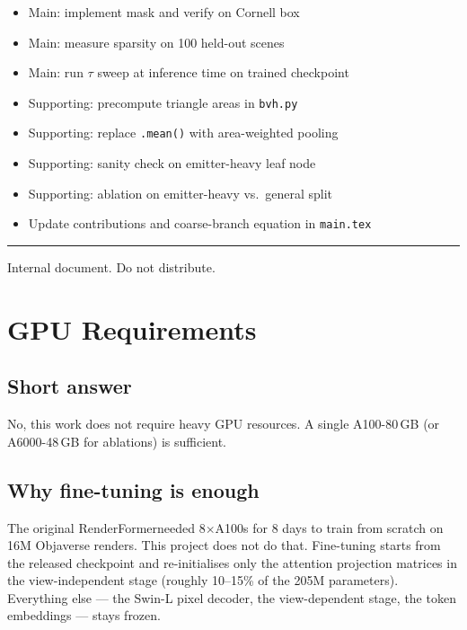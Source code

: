 \documentclass[11pt,letterpaper]{article}
\newcommand{\RF}{RenderFormer}
\newcommand{\code}[1]{\texttt{#1}}
\begin{document}
\begin{itemize}[nosep]
  \item[$\square$] Main: implement mask and verify on Cornell box
  \item[$\square$] Main: measure sparsity on 100 held-out scenes
  \item[$\square$] Main: run $\tau$ sweep at inference time on trained checkpoint
  \item[$\square$] Supporting: precompute triangle areas in \code{bvh.py}
  \item[$\square$] Supporting: replace \code{.mean()} with area-weighted pooling
  \item[$\square$] Supporting: sanity check on emitter-heavy leaf node
  \item[$\square$] Supporting: ablation on emitter-heavy vs.\ general split
  \item[$\square$] Update contributions and coarse-branch equation in \texttt{main.tex}
\end{itemize}

\vspace{10pt}
\hrule
{\small\color{gray} Internal document. Do not distribute.}

\newpage
\section*{GPU Requirements}

\subsection*{Short answer}

No, this work does not require heavy GPU resources.
A single A100-80\,GB (or A6000-48\,GB for ablations) is sufficient.

\subsection*{Why fine-tuning is enough}

The original \RF needed 8$\times$A100s for 8 days to train from scratch on
16M Objaverse renders.
This project does not do that.
Fine-tuning starts from the released checkpoint and re-initialises only
the attention projection matrices in the view-independent stage (roughly
10--15\% of the 205M parameters).
Everything else --- the Swin-L pixel decoder, the view-dependent stage,
the token embeddings --- stays frozen.
\end{document}

